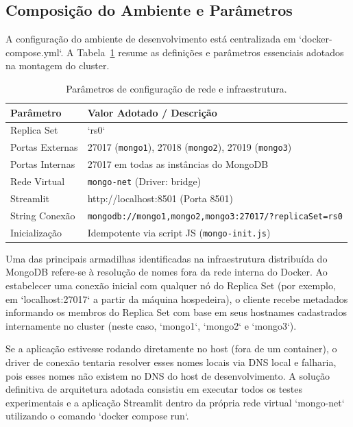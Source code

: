 \documentclass[12pt]{article}
\begin{document}
\subsection{Composição do Ambiente e Parâmetros}

A configuração do ambiente de desenvolvimento está centralizada em `docker-compose.yml`. A Tabela~\ref{tab:config} resume as definições e parâmetros essenciais adotados na montagem do cluster.

\begin{table}[ht]
\centering
\caption{Parâmetros de configuração de rede e infraestrutura.}
\label{tab:config}
\small
\begin{tabular}{lp{8cm}}
\toprule
\textbf{Parâmetro} & \textbf{Valor Adotado / Descrição} \\
\midrule
Replica Set & `rs0` \\
Portas Externas & 27017 (\texttt{mongo1}), 27018 (\texttt{mongo2}), 27019 (\texttt{mongo3}) \\
Portas Internas & 27017 em todas as instâncias do MongoDB \\
Rede Virtual & \texttt{mongo-net} (Driver: bridge) \\
Streamlit & http://localhost:8501 (Porta 8501) \\
String Conexão & \texttt{mongodb://mongo1,mongo2,mongo3:27017/?replicaSet=rs0} \\
Inicialização & Idempotente via script JS (\texttt{mongo-init.js}) \\
\bottomrule
\end{tabular}
\end{table}

Uma das principais armadilhas identificadas na infraestrutura distribuída do MongoDB refere-se à resolução de nomes fora da rede interna do Docker. Ao estabelecer uma conexão inicial com qualquer nó do Replica Set (por exemplo, em `localhost:27017` a partir da máquina hospedeira), o cliente recebe metadados informando os membros do Replica Set com base em seus hostnames cadastrados internamente no cluster (neste caso, `mongo1`, `mongo2` e `mongo3`). 

Se a aplicação estivesse rodando diretamente no host (fora de um container), o driver de conexão tentaria resolver esses nomes locais via DNS local e falharia, pois esses nomes não existem no DNS do host de desenvolvimento. A solução definitiva de arquitetura adotada consistiu em executar todos os testes experimentais e a aplicação Streamlit dentro da própria rede virtual `mongo-net` utilizando o comando `docker compose run`.
\end{document}
